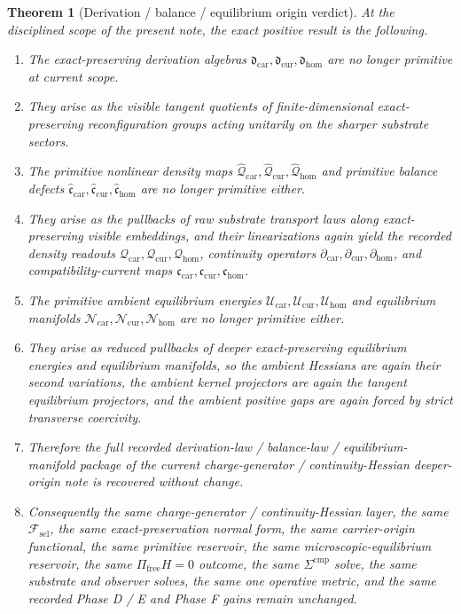 \documentclass[11pt]{article}
\newcommand{\StemFunctional}{\mathscr F_{\mathrm{sel}}}
\newcommand{\TensorCurrent}{\mathfrak c_{\mathrm{car}}}
\newcommand{\CurCurrent}{\mathfrak c_{\mathrm{cur}}}
\newcommand{\HomCurrent}{\mathfrak c_{\mathrm{hom}}}
\newcommand{\TensorDensity}{\mathcal Q_{\mathrm{car}}}
\newcommand{\CurDensity}{\mathcal Q_{\mathrm{cur}}}
\newcommand{\HomDensity}{\mathcal Q_{\mathrm{hom}}}
\newcommand{\TensorCont}{\partial_{\mathrm{car}}}
\newcommand{\CurCont}{\partial_{\mathrm{cur}}}
\newcommand{\HomCont}{\partial_{\mathrm{hom}}}
\newcommand{\TensorDerAlg}{\mathfrak d_{\mathrm{car}}}
\newcommand{\CurDerAlg}{\mathfrak d_{\mathrm{cur}}}
\newcommand{\HomDerAlg}{\mathfrak d_{\mathrm{hom}}}
\newcommand{\TensorPrimitiveDensity}{\widehat{\mathcal Q}_{\mathrm{car}}}
\newcommand{\CurPrimitiveDensity}{\widehat{\mathcal Q}_{\mathrm{cur}}}
\newcommand{\HomPrimitiveDensity}{\widehat{\mathcal Q}_{\mathrm{hom}}}
\newcommand{\TensorBalance}{\widehat{\mathfrak c}_{\mathrm{car}}}
\newcommand{\CurBalance}{\widehat{\mathfrak c}_{\mathrm{cur}}}
\newcommand{\HomBalance}{\widehat{\mathfrak c}_{\mathrm{hom}}}
\newcommand{\TensorAmbientEnergy}{\mathcal U_{\mathrm{car}}}
\newcommand{\CurAmbientEnergy}{\mathcal U_{\mathrm{cur}}}
\newcommand{\HomAmbientEnergy}{\mathcal U_{\mathrm{hom}}}
\newcommand{\TensorEqManifold}{\mathcal N_{\mathrm{car}}}
\newcommand{\CurEqManifold}{\mathcal N_{\mathrm{cur}}}
\newcommand{\HomEqManifold}{\mathcal N_{\mathrm{hom}}}
\newtheorem{theorem}{Theorem}
\begin{document}
\begin{theorem}[Derivation / balance / equilibrium origin verdict]
\label{thm:verdict}
At the disciplined scope of the present note, the exact positive result is the following.
\begin{enumerate}
    \item The exact-preserving derivation algebras \(\TensorDerAlg,\CurDerAlg,\HomDerAlg\) are no longer primitive at current scope.
    \item They arise as the visible tangent quotients of finite-dimensional exact-preserving reconfiguration groups acting unitarily on the sharper substrate sectors.
    \item The primitive nonlinear density maps \(\TensorPrimitiveDensity,\CurPrimitiveDensity,\HomPrimitiveDensity\) and primitive balance defects \(\TensorBalance,\CurBalance,\HomBalance\) are no longer primitive either.
    \item They arise as the pullbacks of raw substrate transport laws along exact-preserving visible embeddings, and their linearizations again yield the recorded density readouts \(\TensorDensity,\CurDensity,\HomDensity\), continuity operators \(\TensorCont,\CurCont,\HomCont\), and compatibility-current maps \(\TensorCurrent,\CurCurrent,\HomCurrent\).
    \item The primitive ambient equilibrium energies \(\TensorAmbientEnergy,\CurAmbientEnergy,\HomAmbientEnergy\) and equilibrium manifolds \(\TensorEqManifold,\CurEqManifold,\HomEqManifold\) are no longer primitive either.
    \item They arise as reduced pullbacks of deeper exact-preserving equilibrium energies and equilibrium manifolds, so the ambient Hessians are again their second variations, the ambient kernel projectors are again the tangent equilibrium projectors, and the ambient positive gaps are again forced by strict transverse coercivity.
    \item Therefore the full recorded derivation-law / balance-law / equilibrium-manifold package of the current charge-generator / continuity-Hessian deeper-origin note is recovered without change.
    \item Consequently the same charge-generator / continuity-Hessian layer, the same \(\StemFunctional\), the same exact-preservation normal form, the same carrier-origin functional, the same primitive reservoir, the same microscopic-equilibrium reservoir, the same \(\Pi_{\mathrm{free}}H=0\) outcome, the same \(\Sigma^{\mathrm{cmp}}\) solve, the same substrate and observer solves, the same one operative metric, and the same recorded Phase D / E and Phase F gains remain unchanged.

\end{enumerate}
\end{theorem}
\end{document}
